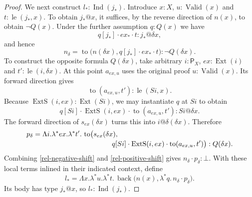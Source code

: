 \begin{proof}
We next construct $l_*:\operatorname{Ind}(j_*)$.
Introduce $x:X$, $u:\operatorname{Valid}(x)$ and
$t:\operatorname{le}(j_*,x)$.  To obtain $j_*@x$, it suffices,
by the reverse direction of $n(x)$, to obtain $\neg Q(x)$.
Under the further assumption $q:Q(x)$ we have
\[
 q[j_*]\cdot ex_*\cdot t:j_*@\delta x,
\]
and hence
\begin{equation}
 n_\delta=
 \operatorname{to}\bigl(n(\delta x),q[j_*]\cdot ex_*\cdot t\bigr)
                  :\neg Q(\delta x).
 \label{rel-negative-shift}
\end{equation}
To construct the opposite formula $Q(\delta x)$, take arbitrary
$i:\mathsf P_X$, $ex:\operatorname{Ext}(i)$ and
$t':\operatorname{le}(i,\delta x)$.  At this point
$a_{ex,u}$ uses the original proof $u:\operatorname{Valid}(x)$.
Its forward direction gives
\[
 \operatorname{to}(a_{ex,u},t'):\operatorname{le}(Si,x).
\]
Because $\operatorname{ExtS}(i,ex):\operatorname{Ext}(Si)$,
we may instantiate $q$ at $Si$ to obtain
\[
 q[Si]\cdot\operatorname{ExtS}(i,ex)\cdot
           \operatorname{to}(a_{ex,u},t'):Si@\delta x.
\]
The forward direction of $s_{ex}(\delta x)$ turns this into
$i@\delta(\delta x)$.  Therefore
\begin{equation}
 \begin{split}
 p_\delta={}&\Lambda i.\lambda^*ex.\lambda^*t'.\,
 \operatorname{to}\bigl(s_{ex}(\delta x),\\[-2pt]
 &\hspace{35mm}
 q[Si]\cdot\operatorname{ExtS}(i,ex)\cdot
                   \operatorname{to}(a_{ex,u},t')\bigr)
       :Q(\delta x).
 \end{split}
 \label{rel-positive-shift}
\end{equation}
Combining \eqref{rel-negative-shift} and \eqref{rel-positive-shift}
gives $n_\delta\cdot p_\delta:\bot$.  With these local terms
inlined in their indicated context, define
\[
 l_*=
 \Lambda x.\lambda^*u.\lambda^*t.\,
 \operatorname{back}\bigl(n(x),
                  \lambda^*q.\,n_\delta\cdot p_\delta\bigr).
\]
Its body has type $j_*@x$, so
$l_*:\operatorname{Ind}(j_*)$.


\end{proof}
